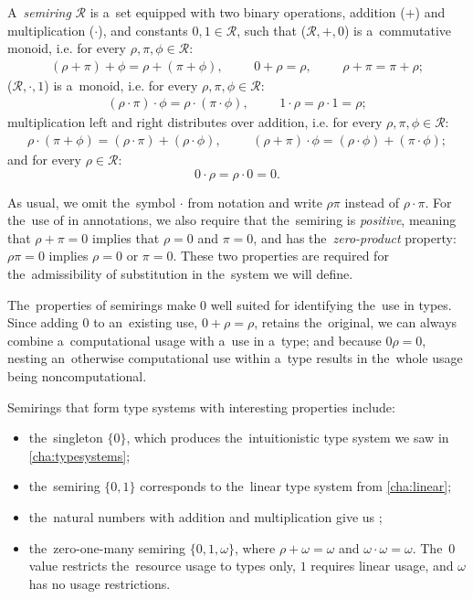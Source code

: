 \begin{definition}
  A~\emph{semiring} $\mathcal{R}$ is a~set equipped with two binary operations,
  addition ($+$) and multiplication ($\cdot$), and constants $0, 1 \in
  \mathcal{R}$, such that ($\mathcal{R}, +, 0$) is a~commutative monoid, i.e.
  for every $\rho, \pi, \phi \in \mathcal{R}$:
  \begin{align*}
    (\rho+\pi)+\phi = \rho+(\pi+\phi),&  &  &0 + \rho = \rho,&  &
    &\rho + \pi = \pi + \rho;
  \end{align*}
  ($\mathcal{R}, \cdot, 1$) is a~monoid, i.e. for every $\rho, \pi, \phi
  \in \mathcal{R}$:
  \begin{align*}
    (\rho \cdot \pi) \cdot \phi = \rho \cdot (\pi \cdot \phi),&  &
    &1 \cdot \rho = \rho \cdot 1 = \rho;
  \end{align*}
  multiplication left and right distributes over addition, i.e. for every $\rho,
  \pi, \phi \in \mathcal{R}$:
  \begin{align*}
    \rho \cdot (\pi + \phi) = (\rho \cdot \pi) + (\rho \cdot \phi),&  &
    &(\rho + \pi) \cdot \phi = (\rho \cdot \phi) + (\pi \cdot \phi);
  \end{align*}
  and for every $\rho \in \mathcal{R}$:
  \[
    0 \cdot \rho = \rho \cdot 0 = 0.
  \]
\end{definition}
As usual, we omit the~symbol $\cdot$ from notation and write $\rho\pi$ instead
of $\rho\cdot\pi$. For the~use of in annotations, we also require that
the~semiring is \emph{positive}, meaning that $\rho + \pi = 0$ implies that
$\rho = 0$ and $\pi = 0$, and has the~\emph{zero-product} property:
$\rho\pi = 0$ implies $\rho = 0$ or $\pi = 0$. These two properties are required
for the~admissibility of substitution in the~system we will define.

The~properties of semirings make $0$ well suited for identifying the~use in
types. Since adding $0$ to an~existing use, $0 + \rho = \rho$, retains
the~original, we can always combine a~computational usage with a~use in a~type;
and because $0\rho = 0$, nesting an~otherwise computational use within a~type
results in the~whole usage being noncomputational.

Semirings that form type systems with interesting properties include:
\begin{itemize}
  \item the~singleton $\{0\}$, which produces the~intuitionistic type system we
    saw in \autoref{cha:typesystems};
  \item the~semiring $\{0, 1\}$ corresponds to the~linear type system from
    \autoref{cha:linear};
  \item the~natural numbers with addition and multiplication give us
    \todo{[WHAT?]};
  \item the~zero-one-many semiring $\{0, 1, \omega\}$, where $\rho + \omega =
    \omega$ and $\omega \cdot \omega = \omega$. The~$0$ value restricts
    the~resource usage to types only, $1$ requires linear usage, and $\omega$
    has no usage restrictions.
\end{itemize}

